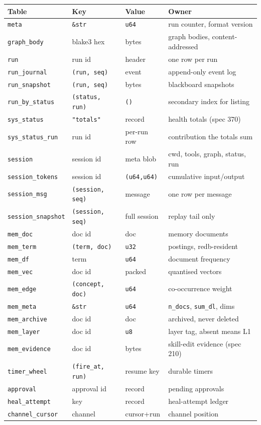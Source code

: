 \begin{longtable}{@{}p{}p{}p{}p{}@{}}
\toprule
\textbf{Table} & \textbf{Key} & \textbf{Value} & \textbf{Owner} \\
\midrule
\endhead
\texttt{meta} & \texttt{\&str} & \texttt{u64} & run counter, format version \\
\texttt{graph\_body} & blake3 hex & bytes & graph bodies, content-addressed \\
\texttt{run} & run id & header & one row per run \\
\texttt{run\_journal} & \texttt{(run, seq)} & event & append-only event log \\
\texttt{run\_snapshot} & \texttt{(run, seq)} & bytes & blackboard snapshots \\
\texttt{run\_by\_status} & \texttt{(status, run)} & \texttt{()} & secondary index for listing \\
\texttt{sys\_status} & \texttt{"totals"} & record & health totals (spec 370) \\
\texttt{sys\_status\_run} & run id & per-run row & contribution the totals sum \\
\texttt{session} & session id & meta blob & cwd, tools, graph, status, run \\
\texttt{session\_tokens} & session id & \texttt{(u64,u64)} & cumulative input/output \\
\texttt{session\_msg} & \texttt{(session, seq)} & message & one row per message \\
\texttt{session\_snapshot} & \texttt{(session, seq)} & full session & replay tail only \\
\texttt{mem\_doc} & doc id & doc & memory documents \\
\texttt{mem\_term} & \texttt{(term, doc)} & \texttt{u32} & postings, redb-resident \\
\texttt{mem\_df} & term & \texttt{u64} & document frequency \\
\texttt{mem\_vec} & doc id & packed & quantised vectors \\
\texttt{mem\_edge} & \texttt{(concept, doc)} & \texttt{u64} & co-occurrence weight \\
\texttt{mem\_meta} & \texttt{\&str} & \texttt{u64} & \texttt{n\_docs}, \texttt{sum\_dl}, dims \\
\texttt{mem\_archive} & doc id & doc & archived, never deleted \\
\texttt{mem\_layer} & doc id & \texttt{u8} & layer tag, absent means L1 \\
\texttt{mem\_evidence} & doc id & bytes & skill-edit evidence (spec 210) \\
\texttt{timer\_wheel} & \texttt{(fire\_at, run)} & resume key & durable timers \\
\texttt{approval} & approval id & record & pending approvals \\
\texttt{heal\_attempt} & key & record & heal-attempt ledger \\
\texttt{channel\_cursor} & channel & cursor+run & channel position \\
\bottomrule
\end{longtable}

